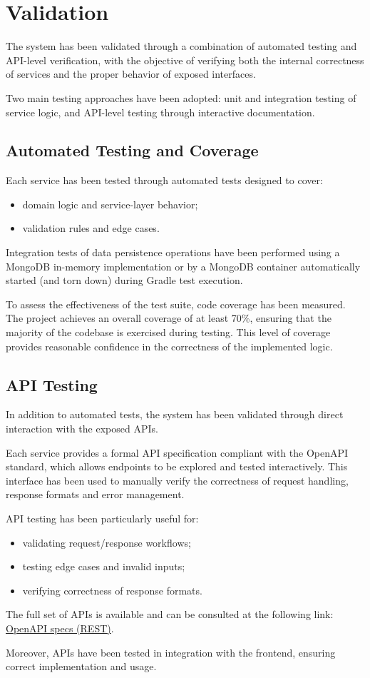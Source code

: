 \section{Validation}

The system has been validated through a combination of automated testing and API-level verification, with the objective of verifying both the internal correctness of services and the proper behavior of exposed interfaces.

Two main testing approaches have been adopted: unit and integration testing of service logic, and API-level testing through interactive documentation.

\subsection{Automated Testing and Coverage}

Each service has been tested through automated tests designed to cover:
\begin{itemize}
  \item domain logic and service-layer behavior;
  \item validation rules and edge cases.
\end{itemize}

Integration tests of data persistence operations have been performed using a MongoDB in-memory implementation or by a MongoDB container automatically started (and torn down) during Gradle test execution.

To assess the effectiveness of the test suite, code coverage has been measured. The project achieves an overall coverage of at least 70\%, ensuring that the majority of the codebase is exercised during testing. This level of coverage provides reasonable confidence in the correctness of the implemented logic.

\subsection{API Testing}

In addition to automated tests, the system has been validated through direct interaction with the exposed APIs.

Each service provides a formal API specification compliant with the OpenAPI standard, which allows endpoints to be explored and tested interactively. This interface has been used to manually verify the correctness of request handling, response formats and error management.

API testing has been particularly useful for:
\begin{itemize}
  \item validating request/response workflows;
  \item testing edge cases and invalid inputs;
  \item verifying correctness of response formats.
\end{itemize}

The full set of APIs is available and can be consulted at the following link: \href{https://eventonight.github.io/EvenToNight/openAPI/}{OpenAPI specs (REST)}.

Moreover, APIs have been tested in integration with the frontend, ensuring correct implementation and usage.
